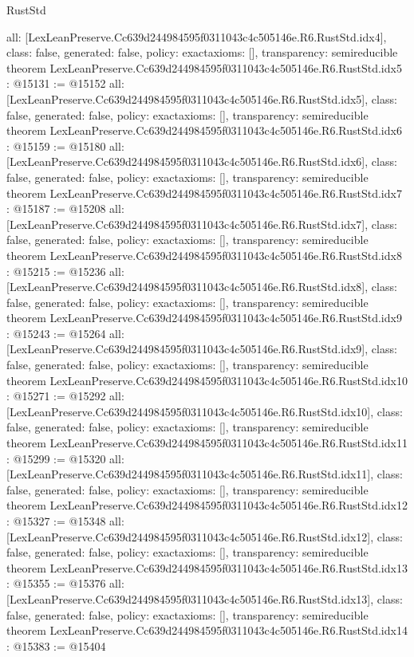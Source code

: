 \begin{lexlean}{RustStd}
\begin{coremodule}
{  all: [LexLeanPreserve.Cc639d244984595f0311043c4c505146e.R6.RustStd.idx4],
  class: false,
  generated: false,
  policy: exact{axioms: []},
  transparency: semireducible
}
theorem LexLeanPreserve.Cc639d244984595f0311043c4c505146e.R6.RustStd.idx5 : @15131 := @15152 {
  all: [LexLeanPreserve.Cc639d244984595f0311043c4c505146e.R6.RustStd.idx5],
  class: false,
  generated: false,
  policy: exact{axioms: []},
  transparency: semireducible
}
theorem LexLeanPreserve.Cc639d244984595f0311043c4c505146e.R6.RustStd.idx6 : @15159 := @15180 {
  all: [LexLeanPreserve.Cc639d244984595f0311043c4c505146e.R6.RustStd.idx6],
  class: false,
  generated: false,
  policy: exact{axioms: []},
  transparency: semireducible
}
theorem LexLeanPreserve.Cc639d244984595f0311043c4c505146e.R6.RustStd.idx7 : @15187 := @15208 {
  all: [LexLeanPreserve.Cc639d244984595f0311043c4c505146e.R6.RustStd.idx7],
  class: false,
  generated: false,
  policy: exact{axioms: []},
  transparency: semireducible
}
theorem LexLeanPreserve.Cc639d244984595f0311043c4c505146e.R6.RustStd.idx8 : @15215 := @15236 {
  all: [LexLeanPreserve.Cc639d244984595f0311043c4c505146e.R6.RustStd.idx8],
  class: false,
  generated: false,
  policy: exact{axioms: []},
  transparency: semireducible
}
theorem LexLeanPreserve.Cc639d244984595f0311043c4c505146e.R6.RustStd.idx9 : @15243 := @15264 {
  all: [LexLeanPreserve.Cc639d244984595f0311043c4c505146e.R6.RustStd.idx9],
  class: false,
  generated: false,
  policy: exact{axioms: []},
  transparency: semireducible
}
theorem LexLeanPreserve.Cc639d244984595f0311043c4c505146e.R6.RustStd.idx10 : @15271 := @15292 {
  all: [LexLeanPreserve.Cc639d244984595f0311043c4c505146e.R6.RustStd.idx10],
  class: false,
  generated: false,
  policy: exact{axioms: []},
  transparency: semireducible
}
theorem LexLeanPreserve.Cc639d244984595f0311043c4c505146e.R6.RustStd.idx11 : @15299 := @15320 {
  all: [LexLeanPreserve.Cc639d244984595f0311043c4c505146e.R6.RustStd.idx11],
  class: false,
  generated: false,
  policy: exact{axioms: []},
  transparency: semireducible
}
theorem LexLeanPreserve.Cc639d244984595f0311043c4c505146e.R6.RustStd.idx12 : @15327 := @15348 {
  all: [LexLeanPreserve.Cc639d244984595f0311043c4c505146e.R6.RustStd.idx12],
  class: false,
  generated: false,
  policy: exact{axioms: []},
  transparency: semireducible
}
theorem LexLeanPreserve.Cc639d244984595f0311043c4c505146e.R6.RustStd.idx13 : @15355 := @15376 {
  all: [LexLeanPreserve.Cc639d244984595f0311043c4c505146e.R6.RustStd.idx13],
  class: false,
  generated: false,
  policy: exact{axioms: []},
  transparency: semireducible
}
theorem LexLeanPreserve.Cc639d244984595f0311043c4c505146e.R6.RustStd.idx14 : @15383 := @15404 {
}
\end{coremodule}
\end{lexlean}
